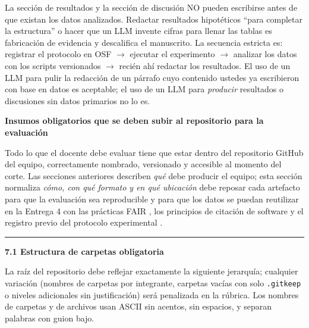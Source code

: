 \documentclass[11pt,a4paper]{article}
\newcounter{secc}
\newcommand{\secband}[1]{%
    \stepcounter{secc}\par\vspace{9pt}\noindent
    {\setlength{\fboxsep}{0pt}%
        \colorbox{uteqgold}{\parbox[c][20pt][c]{0.05\textwidth}{\centering\textbf{\color{white}\small \arabic{secc}}}}%
        \colorbox{uteqgreen}{\parbox[c][20pt][c]{0.95\textwidth}{\hspace{8pt}\textbf{\color{white}\small #1}}}%
    }\par\vspace{5pt}}
\newcommand{\submark}[1]{\par\vspace{4pt}\noindent
    {\color{uteqgreen}\rule[-1pt]{3.5pt}{12pt}}\hspace{6pt}\textbf{\color{uteqgreen}#1}\par\vspace{2pt}}
\begin{document}
\begin{alertbox}[title=Advertencia específica para la redacción del manuscrito]
La sección de resultados y la sección de discusión NO pueden escribirse antes de que existan los datos analizados. Redactar resultados hipotéticos ``para completar la estructura'' o hacer que un LLM invente cifras para llenar las tablas es fabricación de evidencia y descalifica el manuscrito. La secuencia estricta es: registrar el protocolo en OSF $\rightarrow$ ejecutar el experimento $\rightarrow$ analizar los datos con los scripts versionados $\rightarrow$ recién ahí redactar los resultados. El uso de un LLM para pulir la redacción de un párrafo cuyo contenido ustedes ya escribieron con base en datos es aceptable; el uso de un LLM para \emph{producir} resultados o discusiones sin datos primarios no lo es.
\end{alertbox}

\secband{Insumos obligatorios que se deben subir al repositorio para la evaluación}

Todo lo que el docente debe evaluar tiene que estar dentro del repositorio GitHub del equipo, correctamente nombrado, versionado y accesible al momento del corte.
Las secciones anteriores describen \emph{qué} debe producir el equipo; esta sección normaliza \emph{cómo, con qué formato y en qué ubicación} debe reposar cada artefacto para que la evaluación sea reproducible y para que los datos se puedan reutilizar en la Entrega 4 con las prácticas FAIR \cite{wilkinson2016fair}, los principios de citación de software \cite{smith2016force11} y el registro previo del protocolo experimental \cite{nosek2018preregistration}.

\submark{7.1 Estructura de carpetas obligatoria}
La raíz del repositorio debe reflejar exactamente la siguiente jerarquía; cualquier variación (nombres de carpetas por integrante, carpetas vacías con solo \texttt{.gitkeep} o niveles adicionales sin justificación) será penalizada en la rúbrica.
Los nombres de carpetas y de archivos usan ASCII sin acentos, sin espacios, y separan palabras con guion bajo.
\end{document}
